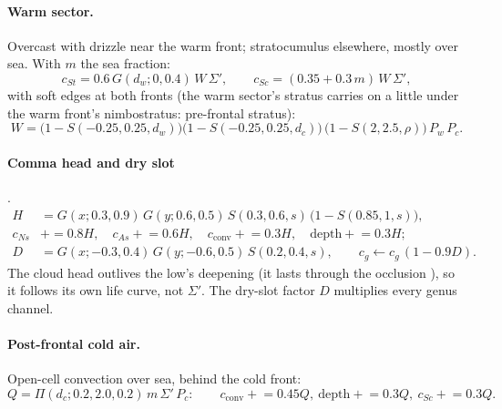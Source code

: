 \documentclass[11pt,a4paper]{article}
\begin{document}
\paragraph{Warm sector.} Overcast with drizzle near the warm front; stratocumulus elsewhere,
mostly over sea. With $m$ the sea fraction:
\begin{equation}
  c_{St}=0.6\,G(d_w;0,0.4)\,W\,\Sigma',\qquad
  c_{Sc}=(0.35+0.3\,m)\,W\,\Sigma',
\end{equation}
with soft edges at both fronts (the warm sector's stratus carries on a little under the warm
front's nimbostratus: pre-frontal stratus):
\begin{equation}
  W=\big(1-S(-0.25,0.25,d_w)\big)\big(1-S(-0.25,0.25,d_c)\big)\,\big(1-S(2,2.5,\rho)\big)\,P_w\,P_c.
\end{equation}

\paragraph{Comma head and dry slot} \cite{carlson1980,browning1994}.
\begin{align}
  H&=G(x;0.3,0.9)\,G(y;0.6,0.5)\,S(0.3,0.6,s)\,\big(1-S(0.85,1,s)\big),\\
  c_{Ns}&\mathrel{+}=0.8H,\quad c_{As}\mathrel{+}=0.6H,\quad c_{\mathrm{conv}}\mathrel{+}=0.3H,
  \quad \mathrm{depth}\mathrel{+}=0.3H;\\
  D&=G(x;-0.3,0.4)\,G(y;-0.6,0.5)\,S(0.2,0.4,s),\qquad
  c_g\leftarrow c_g\,(1-0.9D).
\end{align}
The cloud head outlives the low's deepening (it lasts through the occlusion
\cite{schultz2011}), so it follows its own life curve, not $\Sigma'$. The dry-slot factor $D$
multiplies every genus channel.

\paragraph{Post-frontal cold air.} Open-cell convection over sea, behind the cold front:
\begin{equation}
  Q=\Pi(d_c;0.2,2.0,0.2)\,m\,\Sigma'\,P_c:\qquad
  c_{\mathrm{conv}}\mathrel{+}=0.45Q,\ \mathrm{depth}\mathrel{+}=0.3Q,\ c_{Sc}\mathrel{+}=0.3Q.
\end{equation}
\end{document}
